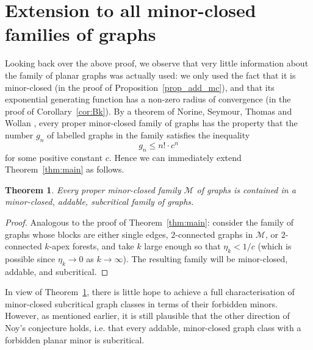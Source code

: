 \documentclass[a4paper]{article}
\newcommand{\M}{\mathcal{M}}
\newtheorem{theorem}[lemma]{Theorem}
\theoremstyle{remark}
\begin{document}
\section{Extension to all minor-closed families of graphs} \label{secdisc}

Looking back over the above proof, we observe that very little information about the family of planar graphs was actually used: we only used the fact that it is minor-closed (in the proof of Proposition~\ref{prop_add_mc}), and that its exponential generating function has a non-zero radius of convergence (in the proof of Corollary~\ref{cor:Bk}). By a theorem of Norine, Seymour, Thomas and Wollan \cite{NSTW}, every proper minor-closed family of graphs has the property that the number $g_n$ of labelled graphs in the family satisfies the inequality
$$g_n \leq n! \cdot c^n$$
for some positive constant $c$. Hence we can immediately extend Theorem~\ref{thm:main} as follows.

\begin{theorem}\label{thm:general}
Every proper minor-closed family $\M$ of graphs is contained in a minor-closed, addable, subcritical family of graphs.
\end{theorem}

\begin{proof}
Analogous to the proof of Theorem~\ref{thm:main}: consider the family of graphs whose blocks are either single edges, $2$-connected graphs in $\M$, or $2$-connected $k$-apex forests, and take $k$ large enough so that $\eta_k < 1/c$ (which is possible since $\eta_k \to 0$ as $k \to \infty$). The resulting family will be minor-closed, addable, and subcritical.
\end{proof}

In view of Theorem~\ref{thm:general}, there is little hope to achieve a full characterisation of minor-closed subcritical graph classes in terms of their forbidden minors. However, as mentioned earlier, it is still plausible that the other direction of Noy's conjecture holds, i.e. that every addable, minor-closed graph class with a forbidden planar minor is subcritical.



\end{document}
